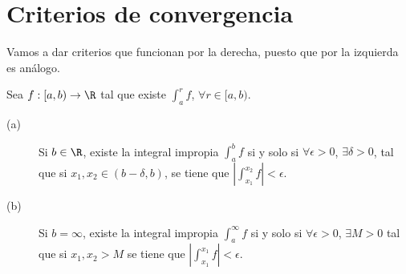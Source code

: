 \section{Criterios de convergencia}
Vamos a dar criterios que funcionan por la derecha, puesto que por la izquierda es análogo.
\begin{ftheorem}
\normalfont Sea $\displaystyle f : [a,b) \to \R $ tal que existe $\displaystyle \int^{r}_{a} f $, $\displaystyle \forall r \in [a,b) $. 
\begin{description}
\item[(a)] Si $\displaystyle b \in \R $, existe la integral impropia $\displaystyle \int^{b}_{a} f  $ si y solo si $\displaystyle \forall \epsilon > 0 $, $\displaystyle \exists \delta > 0 $, tal que si $\displaystyle x_{1}, x_{2} \in \left(b-\delta, b\right) $, se tiene que $\displaystyle \left|\int^{x_{2}}_{x_{1}} f \right|< \epsilon  $.
\item[(b)] Si $\displaystyle b = \infty $, existe la integral impropia $\displaystyle \int^{\infty}_{a} f $ si y solo si $\displaystyle \forall \epsilon > 0 $, $\displaystyle \exists M > 0 $ tal que si $\displaystyle x_{1}, x_{2} > M $ se tiene que $\displaystyle \left|\int^{x_{1}}_{x_{1}} f \right|<\epsilon  $.
\end{description}
\end{ftheorem}
